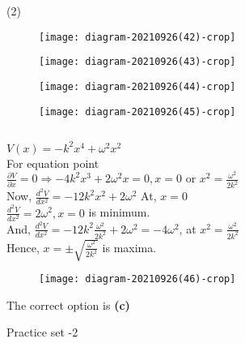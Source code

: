 \begin{enumerate}
	{}
\begin{tasks}(2)
	\task[\textbf{A.}]\begin{figure}[H]
		\centering
		\texttt{[image: diagram-20210926(42)-crop]}
	\end{figure}
	\task[\textbf{B.}]\begin{figure}[H]
		\centering
		\texttt{[image: diagram-20210926(43)-crop]}
	\end{figure}
	\task[\textbf{C.}]\begin{figure}[H]
		\centering
		\texttt{[image: diagram-20210926(44)-crop]}
	\end{figure}
	\task[\textbf{D.}]\begin{figure}[H]
		\centering
		\texttt{[image: diagram-20210926(45)-crop]}
	\end{figure}
\end{tasks}
\begin{answer}$\left. \right. $\\
	\begin{minipage}{0.5\textwidth}
	$V(x)=-k^{2} x^{4}+\omega^{2} x^{2}$\\
	For equation point\\
	$
	\frac{\partial V}{\partial x}=0 \Rightarrow-4 k^{2} x^{3}+2 \omega^{2} x=0, x=0 \text { or } x^{2}=\frac{\omega^{2}}{2 k^{2}}
	$\\
	Now, $\frac{d^{2} V}{d x^{2}}=-12 k^{2} x^{2}+2 \omega^{2}$ At, $x=0$\\
	$\frac{d^{2} V}{d x^{2}}=2 \omega^{2}, x=0$ is minimum.\\
	And, $\frac{d^{2} V}{d x^{2}}=-12 k^{2} \frac{\omega^{2}}{2 k^{2}}+2 \omega^{2}=-4 \omega^{2}$, at $x^{2}=\frac{\omega^{2}}{2 k^{2}}$\\
	Hence, $x=\pm \sqrt{\frac{\omega^{2}}{2 k^{2}}}$ is maxima.
	\end{minipage}
	 \begin{minipage}{0.5\textwidth}
	 \begin{figure}[H]
	 	\centering
	 	\texttt{[image: diagram-20210926(46)-crop]}
	 \end{figure}
	 \end{minipage}
 The correct option is \textbf{(c)}
\end{answer}
\end{enumerate}
\newpage
\begin{abox}
	Practice set -2 
	\end{abox}

